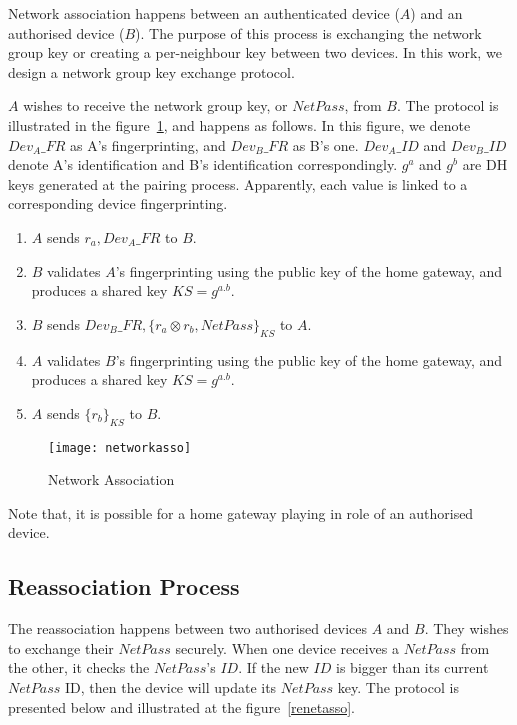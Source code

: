 Network association happens between an authenticated device ($A$) and an authorised device ($B$). The purpose of this process is exchanging the network group key or creating a per-neighbour key between two devices. In this work, we design a network group key exchange protocol.

$A$ wishes to receive the network group key, or $NetPass$, from $B$. The protocol is illustrated in the figure~\ref{netasso}, and happens as follows. In this figure, we denote $Dev_{A}\_FR$ as A's fingerprinting, and $Dev_{B}\_FR$ as B's one. $Dev_{A}\_ID$ and $Dev_{B}\_ID$ denote A's identification and B's identification correspondingly. $g^a$ and $g^b$ are DH keys generated at the pairing process. Apparently, each value is linked to a corresponding device fingerprinting. 

\begin{enumerate}
\item $A$ sends $r_a, Dev_{A}\_FR$ to $B$. 
\item $B$ validates $A$'s fingerprinting using the public key of the home gateway, and produces a shared key $KS = g^{a.b}$.
\item $B$ sends $Dev_{B}\_FR,\{r_a \otimes r_b, NetPass \}_{KS}$ to $A$.
\item $A$ validates $B$'s fingerprinting using the public key of the home gateway, and produces a shared key $KS = g^{a.b}$.
\item $A$ sends $\{r_b\}_{KS}$ to $B$.
\end{enumerate}

\begin{figure}
  \centering
  \texttt{[image: networkasso]}
  \caption{Network Association}
  \label{netasso}
\end{figure}

Note that, it is possible for a home gateway playing in role of an authorised device. 

\subsection{Reassociation Process}
 
The reassociation happens between two authorised devices $A$ and $B$. They wishes to exchange their $NetPass$ securely. When one device receives a $NetPass$ from the other, it checks the $NetPass$'s $ID$. If the new $ID$ is bigger than its current $NetPass$ ID, then the device will update its $NetPass$ key. The protocol is presented below and illustrated at the figure~\ref{renetasso}.

